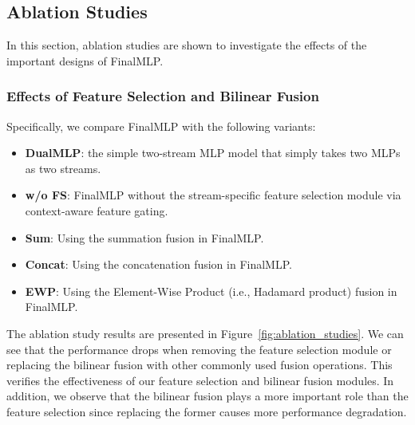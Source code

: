 \documentclass[letterpaper]{article} \usepackage{aaai23}  \usepackage{times}  \usepackage{helvet}  \usepackage{courier}  \usepackage[hyphens]{url}  \usepackage{graphicx} \urlstyle{rm} \def\UrlFont{\rm}  \usepackage{natbib}  \usepackage{caption} \frenchspacing  \setlength{\pdfpagewidth}{8.5in}  \setlength{\pdfpageheight}{11in}  \usepackage{algorithm}
\begin{document}
\subsection{Ablation Studies}
In this section, ablation studies are shown to investigate the effects of the important designs of FinalMLP. 
\subsubsection{Effects of Feature Selection and Bilinear Fusion}
Specifically, we compare FinalMLP with the following variants:
\begin{itemize}
    \item \textbf{DualMLP}: the simple two-stream MLP model that simply takes two MLPs as two streams.
    \item \textbf{w/o FS}: FinalMLP without the stream-specific feature selection module via context-aware feature gating.
    \item \textbf{Sum}: Using the summation fusion in FinalMLP. 
    \item \textbf{Concat}: Using the concatenation fusion in FinalMLP. 
    \item \textbf{EWP}: Using the {E}lement-{W}ise {P}roduct (i.e., Hadamard product) fusion in FinalMLP. 
\end{itemize}
The ablation study results are presented in Figure~\ref{fig:ablation_studies}. 
We can see that the performance drops when removing the feature selection module or replacing the bilinear fusion with other commonly used fusion operations. This verifies the effectiveness of our feature selection and bilinear fusion modules. In addition, we observe that the bilinear fusion plays a more important role than the feature selection since replacing the former causes more performance degradation.


\begin{table}[!t]
\renewcommand\arraystretch{1.05}
\setlength{\tabcolsep}{5.5pt}
\small
\centering
\caption{Bilinear fusion with different numbers of heads.}
\label{tab:ablation_study_group} 
\vspace{-1ex}
\end{table}
\end{document}
